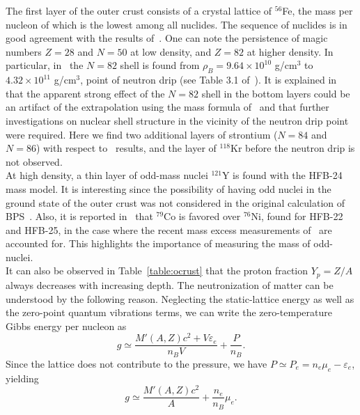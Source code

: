 The first layer of the outer crust consists of a crystal lattice of $^{56}$Fe,
the mass per nucleon of which is the lowest among all nuclides. The sequence of
nuclides is in good agreement with the results of~\cite{Haensel1994}. One can note
the persistence of magic numbers $Z=28$ and $N=50$ at low density, and $Z=82$ at
higher density. In particular, in~\cite{Haensel1994} the $N=82$ shell 
is found from $\rho_B = 9.64\times 10^{10}$ g/cm$^3$ to $4.32\times 10^{11}$
g/cm$^3$, point of neutron drip (see Table 3.1 of~\cite{Haensel2007}). It is 
explained in~\cite{Haensel2007} that 
the apparent strong effect of the $N=82$ shell in the bottom layers could be an 
artifact of the extrapolation using the mass formula of~\cite{Moller1988} and
that further investigations on nuclear shell structure in the vicinity of the
neutron drip point were required. Here we find two additional layers of
strontium ($N=84$ and $N=86$) with respect to~\cite{Haensel1994} results, and
the layer of $^{118}$Kr before the neutron drip is not observed.\\
At high density, a thin layer of odd-mass nuclei $^{121}$Y is found
with the HFB-24 mass model. It is interesting since the possibility of having 
odd nuclei in the ground state of the outer crust was not considered in the
original calculation of BPS~\cite{BPS}. Also, it is reported
in~\cite{Pearson2018} that $^{79}$Co is favored over $^{76}$Ni, found
for HFB-22 and HFB-25, in the case where the recent mass excess measurements
of~\cite{Welker2017} are accounted for. This highlights the importance
of measuring the mass of odd-nuclei. \\
It can also be observed in Table~\ref{table:ocrust} that the proton fraction 
$Y_p = Z/A$ always decreases with increasing depth. The
neutronization of matter can be understood by the following reason. Neglecting 
the static-lattice energy as well as the zero-point quantum vibrations
terms, we can write the zero-temperature Gibbs energy per nucleon as
%
\begin{equation}
  g \simeq \frac{M'(A,Z)c^2 + V\varepsilon_e}{n_BV} + \frac{P}{n_B}.
\end{equation}
%
Since the lattice does not contribute to the pressure, we have $P \simeq P_e =
n_e\mu_e - \varepsilon_e$, yielding
%
\begin{equation}
  g \simeq \frac{M'(A,Z)c^2}{A} + \frac{n_e}{n_B}\mu_e.
\end{equation}
